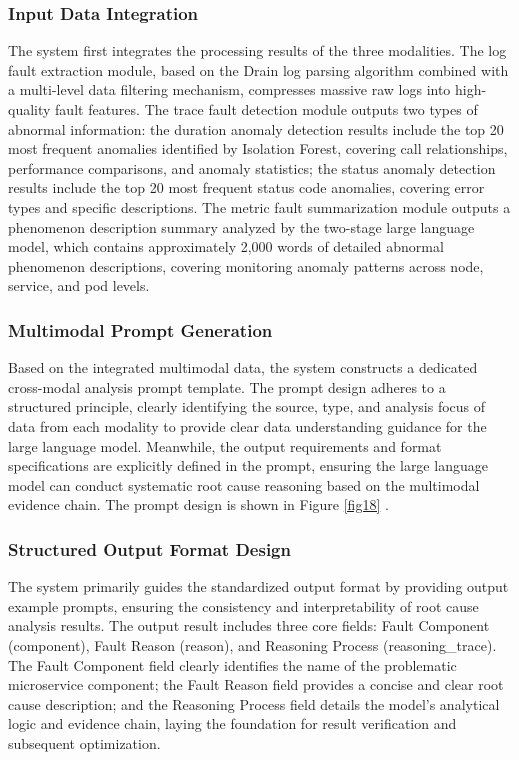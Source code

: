 \documentclass[10pt]{article}
\let\oldref\ref
\renewcommand{\ref}[1]{%
    \textcolor{blue}{\oldref{#1}}%
}
\begin{document}
\subsubsection{Input Data Integration}

The system first integrates the processing results of the three modalities. The log fault extraction module, based on the Drain log parsing algorithm combined with a multi-level data filtering mechanism, compresses massive raw logs into high-quality fault features. The trace fault detection module outputs two types of abnormal information: the duration anomaly detection results include the top 20 most frequent anomalies identified by Isolation Forest, covering call relationships, performance comparisons, and anomaly statistics; the status anomaly detection results include the top 20 most frequent status code anomalies, covering error types and specific descriptions. The metric fault summarization module outputs a phenomenon description summary analyzed by the two-stage large language model, which contains approximately 2,000 words of detailed abnormal phenomenon descriptions, covering monitoring anomaly patterns across node, service, and pod levels.

\subsubsection{Multimodal Prompt Generation}

Based on the integrated multimodal data, the system constructs a dedicated cross-modal analysis prompt template. The prompt design adheres to a structured principle, clearly identifying the source, type, and analysis focus of data from each modality to provide clear data understanding guidance for the large language model. Meanwhile, the output requirements and format specifications are explicitly defined in the prompt, ensuring the large language model can conduct systematic root cause reasoning based on the multimodal evidence chain. The prompt design is shown in Figure \ref{fig18}.

\subsubsection{Structured Output Format Design}

The system primarily guides the standardized output format by providing output example prompts, ensuring the consistency and interpretability of root cause analysis results. The output result includes three core fields: Fault Component (component), Fault Reason (reason), and Reasoning Process (reasoning\_trace). The Fault Component field clearly identifies the name of the problematic microservice component; the Fault Reason field provides a concise and clear root cause description; and the Reasoning Process field details the model’s analytical logic and evidence chain, laying the foundation for result verification and subsequent optimization.
\end{document}
